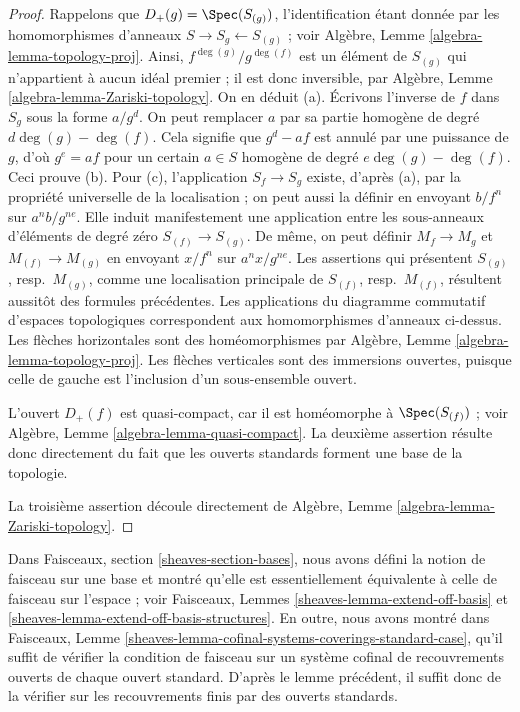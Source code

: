 \begin{proof}
Rappelons que $D_{+}(g) = \Spec(S_{(g)})$, l'identification étant donnée par
les homomorphismes d'anneaux $S \to S_g \leftarrow S_{(g)}$ ; voir
Algèbre, Lemme \ref{algebra-lemma-topology-proj}.
Ainsi, $f^{\deg(g)}/g^{\deg(f)}$ est un élément de $S_{(g)}$ qui n'appartient
à aucun idéal premier ; il est donc inversible, par
Algèbre, Lemme \ref{algebra-lemma-Zariski-topology}.
On en déduit (a).
Écrivons l'inverse de $f$ dans $S_g$ sous la forme $a/g^d$.
On peut remplacer $a$ par sa partie homogène de degré
$d\deg(g) - \deg(f)$.
Cela signifie que $g^d - af$ est annulé par une puissance de $g$, d'où
$g^e = af$ pour un certain $a \in S$ homogène de degré
$e\deg(g) - \deg(f)$. Ceci prouve (b).
Pour (c), l'application $S_f \to S_g$ existe, d'après (a), par la propriété
universelle de la localisation ; on peut aussi la définir en envoyant $b/f^n$
sur $a^nb/g^{ne}$. Elle induit manifestement une application entre les
sous-anneaux d'éléments de degré zéro $S_{(f)} \to S_{(g)}$.
De même, on peut définir $M_f \to M_g$ et $M_{(f)} \to M_{(g)}$ en envoyant
$x/f^n$ sur $a^nx/g^{ne}$. Les assertions qui présentent $S_{(g)}$, resp.\ $M_{(g)}$, comme une
localisation principale de $S_{(f)}$, resp.\ $M_{(f)}$, résultent aussitôt des formules précédentes.
Les applications du diagramme commutatif d'espaces topologiques correspondent
aux homomorphismes d'anneaux ci-dessus. Les flèches horizontales sont des
homéomorphismes par Algèbre, Lemme \ref{algebra-lemma-topology-proj}.
Les flèches verticales sont des immersions ouvertes, puisque celle de gauche
est l'inclusion d'un sous-ensemble ouvert.

\medskip\noindent
L'ouvert $D_{+}(f)$ est quasi-compact, car il est homéomorphe à
$\Spec(S_{(f)})$ ; voir Algèbre, Lemme
\ref{algebra-lemma-quasi-compact}.
La deuxième assertion résulte donc directement du fait que les ouverts
standards forment une base de la topologie.

\medskip\noindent
La troisième assertion découle directement de
Algèbre, Lemme \ref{algebra-lemma-Zariski-topology}.
\end{proof}

\noindent
Dans Faisceaux, section \ref{sheaves-section-bases}, nous avons défini
la notion de faisceau sur une base et montré qu'elle est essentiellement
équivalente à celle de faisceau sur l'espace ; voir Faisceaux, Lemmes
\ref{sheaves-lemma-extend-off-basis} et
\ref{sheaves-lemma-extend-off-basis-structures}. En outre, nous avons montré
dans Faisceaux, Lemme
\ref{sheaves-lemma-cofinal-systems-coverings-standard-case}, qu'il suffit de
vérifier la condition de faisceau sur un système cofinal de recouvrements
ouverts de chaque ouvert standard. D'après
le lemme précédent, il suffit donc
de la vérifier sur les recouvrements finis par des ouverts standards.

